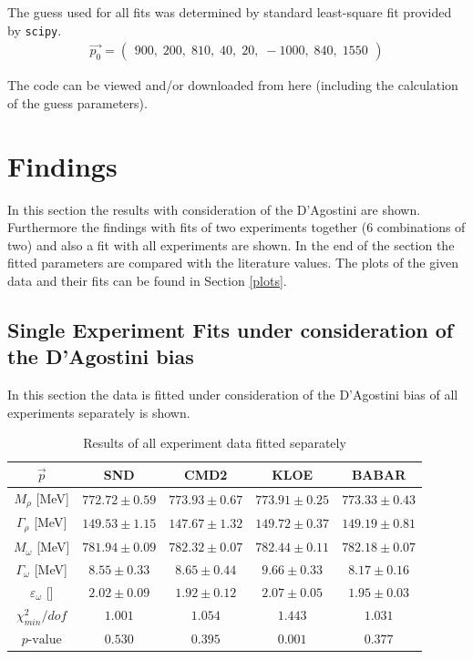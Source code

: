 \documentclass[a4paper]{article}
\begin{document}
The guess used for all fits was determined by standard least-square fit
provided by \texttt{scipy}.
    \begin{align}
            \vec{p_0} =
            \begin{pmatrix}
            900,\; 200,\; 810,\; 40,\; 20,\; -1000,\; 840,\; 1550
            \end{pmatrix}
    \end{align}

The code can be viewed and/or downloaded from here \cite{code}
(including the calculation of the guess parameters).
\newpage
\section{Findings}

In this section the results with consideration of the D'Agostini are shown.
Furthermore the findings with fits of two experiments together
(6 combinations of two) and also a fit with all experiments
are shown. In the end of the section the fitted parameters are compared with
the literature values. The plots of the given data and their fits can be found in Section \ref{plots}.

\subsection{Single Experiment Fits under consideration of the D'Agostini bias}
In this section the data is fitted under consideration of the D'Agostini bias of all experiments separately is shown.
\begin{table}[H]
    \caption{Results of all experiment data fitted separately\label{tabsingle}}
    \centering
    \begin{tabular}{|c|c|c|c|c|}
        \hline
        $\vec{p}$ & SND & CMD2 & KLOE & BABAR \\ \hline
        $M_{\rho}$    [MeV]          & $772.72	\pm 0.59$ & $773.93	\pm 0.67$ &$773.91	\pm 0.25 $&$773.33	\pm 0.43$ \\
        $\Gamma_{\rho}$   [MeV]      & $149.53	\pm 1.15$ & $147.67	\pm 1.32$ &$149.72	\pm 0.37 $&$149.19	\pm 0.81$\\
        $M_{\omega}$      [MeV]      & $781.94	\pm 0.09$ & $782.32	\pm 0.07$ &$782.44	\pm 0.11 $&$782.18	\pm 0.07$\\
        $\Gamma_{\omega}$    [MeV]   & $8.55	\pm 0.33    $ & $8.65	\pm 0.44$ &$9.66	\pm 0.33 $&$8.17	\pm 0.16$\\
        $\varepsilon_{\omega}$ [] & $2.02	\pm 0.09    $ & $1.92	\pm 0.12$ &$2.07	\pm 0.05 $&$1.95	\pm 0.03$\\
        \hline \hline
        $\chi^2_{min}/dof$      & $1.001$&$ 1.054$&$ 1.443$&$ 1.031$\\
        $p\text{-value}$        & $0.530$&$ 0.395$&$ 0.001$&$ 0.377$\\
        \hline
    \end{tabular}
\end{table}
\end{document}
